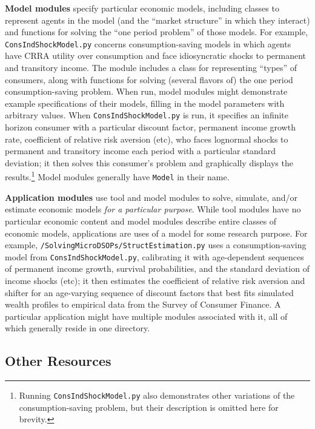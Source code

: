 \documentclass[12pt,titlepage,letterpaper]{econtex}
\begin{document}
\textbf{Model modules} specify particular economic models, including classes to represent agents in the model (and the ``market structure'' in which they interact) and functions for solving the ``one period problem'' of those models.  For example, \texttt{ConsIndShockModel.py} concerns consumption-saving models in which agents have CRRA utility over consumption and face idiosyncratic shocks to permanent and transitory income.  The module includes a class for representing ``types'' of consumers, along with functions for solving (several flavors of) the one period consumption-saving problem.  When run, model modules might demonstrate example specifications of their models, filling in the model parameters with arbitrary values.  When \texttt{ConsIndShockModel.py} is run, it specifies an infinite horizon consumer with a particular discount factor, permanent income growth rate, coefficient of relative risk aversion (etc), who faces lognormal shocks to permanent and transitory income each period with a particular standard deviation; it then solves this consumer's problem and graphically displays the results.\footnote{Running \texttt{ConsIndShockModel.py} also demonstrates other variations of the consumption-saving problem, but their description is omitted here for brevity.}  Model modules generally have \texttt{Model} in their name.

\textbf{Application modules} use tool and model modules to solve, simulate, and/or estimate economic models \textit{for a particular purpose}.  While tool modules have no particular economic content and model modules describe entire classes of economic models, applications are uses of a model for some research purpose.  For example, \texttt{/SolvingMicroDSOPs/StructEstimation.py} uses a consumption-saving model from \texttt{ConsIndShockModel.py}, calibrating it with age-dependent sequences of permanent income growth, survival probabilities, and the standard deviation of income shocks (etc); it then estimates the coefficient of relative risk aversion and shifter for an age-varying sequence of discount factors that best fits simulated wealth profiles to empirical data from the Survey of Consumer Finance.  A particular application might have multiple modules associated with it, all of which generally reside in one directory.

\subsection{Other Resources}\label{sec:OtherResources}
\end{document}
